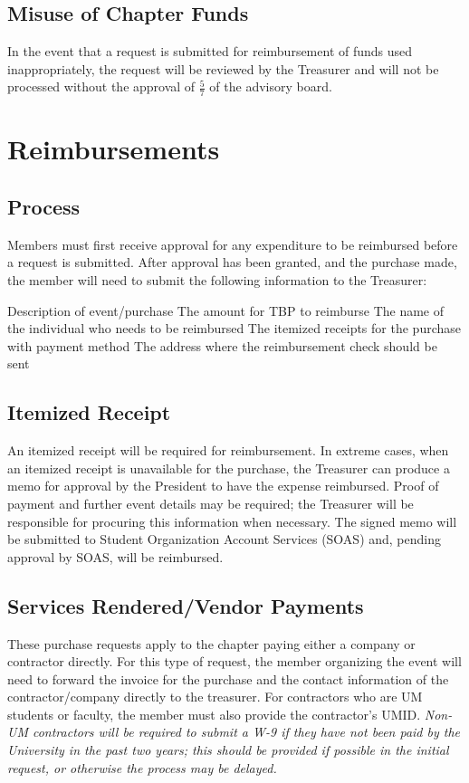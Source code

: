 \documentclass[bylaws,final,10pt,withoutoptional,withoutpreface,officerdoc]{../bylaws}
\begin{document}
\section{Misuse of Chapter Funds} In the event that a request is submitted for reimbursement of funds used inappropriately, the request will be reviewed by the Treasurer and will not be processed without the approval of $\frac{5}{7}$ of the advisory board. 

\chapter{Reimbursements}\label{sec:reimbursement}

\section{Process} Members must first receive approval for any expenditure to be reimbursed before a request is submitted. After approval has been granted, and the purchase made, the member will need to submit the following information to the Treasurer:
\begin{enumsubsection}
	\itemnotoc Description of event/purchase
	\itemnotoc The amount for TBP to reimburse
	\itemnotoc The name of the individual who needs to be reimbursed
	\itemnotoc The itemized receipts for the purchase with payment method
	\itemnotoc The address where the reimbursement check should be sent
\end{enumsubsection}

\section{Itemized Receipt} An itemized receipt will be required for reimbursement. In extreme cases, when an itemized receipt is unavailable for the purchase, the Treasurer can produce a memo for approval by the President to have the expense reimbursed. Proof of payment and further event details may be required; the Treasurer will be responsible for procuring this information when necessary. The signed memo will be submitted to Student Organization Account Services (SOAS) and, pending approval by SOAS, will be reimbursed.

\section{Services Rendered/Vendor Payments} These purchase requests apply to the chapter paying either a company or contractor directly. For this type of request, the member organizing the event will need to forward the invoice for the purchase and the contact information of the contractor/company directly to the treasurer. For contractors who are UM students or faculty, the member must also provide the contractor's UMID. {\it Non-UM contractors will be required to submit a W-9 if they have not been paid by the University in the past two years; this should be provided if possible in the initial request, or otherwise the process may be delayed.}
\end{document}
